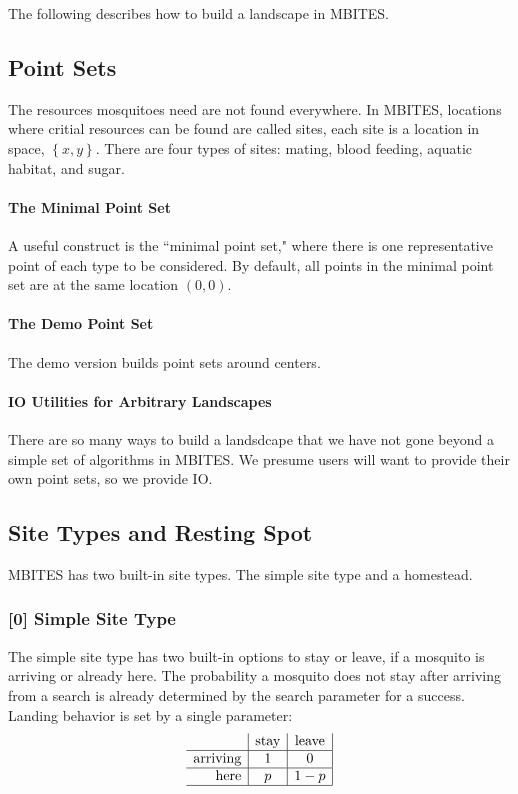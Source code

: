 \documentclass{article}
\begin{document}
The following describes how to build a landscape in MBITES. 

\subsection{Point Sets}

The resources mosquitoes need are not found everywhere.  In MBITES, locations where critial resources can be found are called sites, each site is a location in space, $\left\{ x,y \right\}$. There are four types of sites: mating, blood feeding, aquatic habitat, and sugar. 

\paragraph{The Minimal Point Set}

A useful construct is the ``minimal point set," where there is one representative point of each type to be considered. By default, all points in the minimal point set are at the same location $(0,0)$. 

\paragraph{The Demo Point Set}

The demo version builds point sets around centers. 

\paragraph{IO Utilities for Arbitrary Landscapes}

There are so many ways to build a landsdcape that we have not gone beyond a simple set of algorithms in MBITES. We presume users will want to provide their own point sets, so we provide IO. 

\subsection{Site Types and Resting Spot}

MBITES has two built-in site types. The simple site type and a homestead. 

\subsubsection*{[0] Simple Site Type}

The simple site type has two built-in options to stay or leave, if a mosquito is arriving or already here. The probability a mosquito does not stay after arriving from a search is already determined by the search parameter for a success. Landing behavior is set by a single parameter:
\begin{equation}
\begin{array}{r|c|c|}
& \mbox{stay} & \mbox{leave} \\ \hline  
\mbox{arriving} & 1 & 0 \\ \hline 
\mbox{here} & p & 1-p \\ \hline 
\end{array}
\end{equation}
\end{document}
